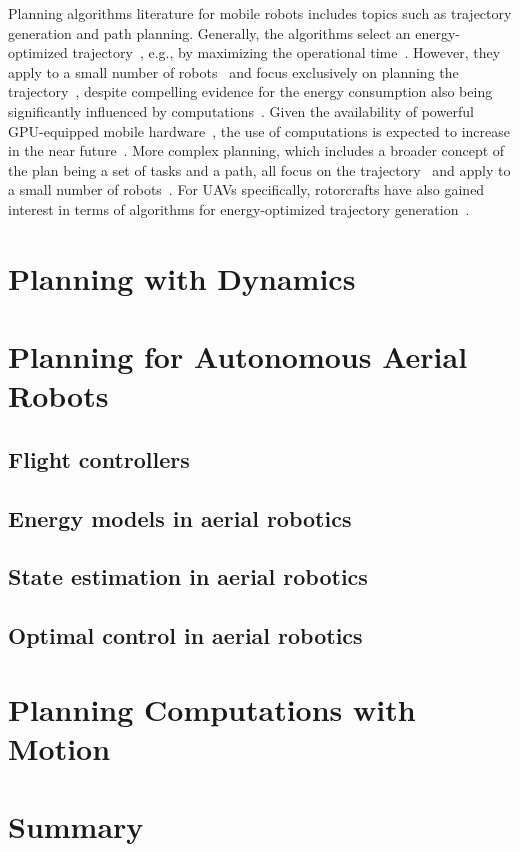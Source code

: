 Planning algorithms literature for mobile robots includes topics such as trajectory generation and path planning. Generally, the algorithms select an energy-optimized trajectory~\cite{mei2004energy}, e.g., by maximizing the operational time~\cite{wahab2015energy}. However, they apply to a small number of robots~\cite{kim2005energy} and focus exclusively on planning the trajectory~\cite{kim2008minimum}, despite compelling evidence for the energy consumption also being significantly influenced by computations~\cite{mei2005case}. Given the availability of powerful GPU-equipped mobile hardware~\cite{rizvi2017general}, the use of computations is expected to increase in the near future~\cite{abramov2012real,satria2016real,jaramillo2019visual}. More complex planning, which includes a broader concept of the plan being a set of tasks and a path, all focus on the trajectory~\cite{mei2005case,mei2006deployment} and apply to a small number of robots~\cite{sadrpour2013mission,sadrpour2013experimental}. For UAVs specifically, rotorcrafts have also gained interest in terms of algorithms for energy-optimized trajectory generation~\cite{morbidi2016minimum,kreciglowa2017energy}. 


\section{\color{red}Planning with Dynamics}
\label{sec:soa-dynamics-pl}

\section{\color{red}Planning for Autonomous Aerial Robots}
\label{sec:soa-aerial-pl}

\subsection{\color{red}Flight controllers}

\subsection{\color{orange}Energy models in aerial robotics}

\subsection{\color{orange}State estimation in aerial robotics}

\subsection{\color{orange}Optimal control in aerial robotics}


\section{\color{red}Planning Computations with Motion}
\label{sec:soa-comp-motion-pl}

\section{\color{red}Summary}

